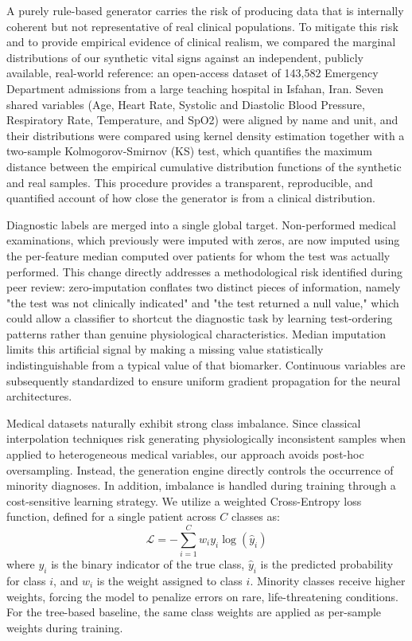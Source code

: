 A purely rule-based generator carries the risk of producing data that is internally coherent but not representative of real clinical populations. To mitigate this risk and to provide empirical evidence of clinical realism, we compared the marginal distributions of our synthetic vital signs against an independent, publicly available, real-world reference: an open-access dataset of 143,582 Emergency Department admissions from a large teaching hospital in Isfahan, Iran. Seven shared variables (Age, Heart Rate, Systolic and Diastolic Blood Pressure, Respiratory Rate, Temperature, and SpO2) were aligned by name and unit, and their distributions were compared using kernel density estimation together with a two-sample Kolmogorov-Smirnov (KS) test, which quantifies the maximum distance between the empirical cumulative distribution functions of the synthetic and real samples. This procedure provides a transparent, reproducible, and quantified account of how close the generator is from a clinical distribution.

Diagnostic labels are merged into a single global target. Non-performed medical examinations, which previously were imputed with zeros, are now imputed using the per-feature median computed over patients for whom the test was actually performed. This change directly addresses a methodological risk identified during peer review: zero-imputation conflates two distinct pieces of information, namely "the test was not clinically indicated" and "the test returned a null value," which could allow a classifier to shortcut the diagnostic task by learning test-ordering patterns rather than genuine physiological characteristics. Median imputation limits this artificial signal by making a missing value statistically indistinguishable from a typical value of that biomarker. Continuous variables are subsequently standardized to ensure uniform gradient propagation for the neural architectures.

Medical datasets naturally exhibit strong class imbalance. Since classical interpolation techniques risk generating physiologically inconsistent samples when applied to heterogeneous medical variables, our approach avoids post-hoc oversampling. Instead, the generation engine directly controls the occurrence of minority diagnoses. In addition, imbalance is handled during training through a cost-sensitive learning strategy. We utilize a weighted Cross-Entropy loss function, defined for a single patient across $C$ classes as:
\begin{equation}
\mathcal{L} = - \sum_{i=1}^{C} w_i y_i \log(\hat{y}_i)
\end{equation}
where $y_i$ is the binary indicator of the true class, $\hat{y}_i$ is the predicted probability for class $i$, and $w_i$ is the weight assigned to class $i$. Minority classes receive higher weights, forcing the model to penalize errors on rare, life-threatening conditions. For the tree-based baseline, the same class weights are applied as per-sample weights during training.


